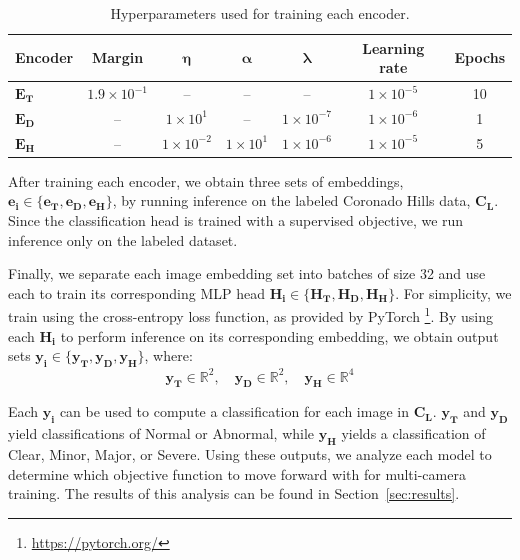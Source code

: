 \documentclass{article}
\begin{document}
\begin{table}[H]
\centering

\caption{Hyperparameters used for training each encoder.}
\label{tab:hyperparams}

\begin{tabular}{lcccccc}
\toprule
\textbf{Encoder} & \textbf{Margin} & $\boldsymbol{\eta}$ & $\boldsymbol{\alpha}$ & $\boldsymbol{\lambda}$ & \textbf{Learning rate} & \textbf{Epochs} \\
\midrule

$\mathbf{E_T}$ & $1.9 \times 10^{-1}$ & -- & -- & -- & $1 \times 10^{-5}$ & 10 \\
$\mathbf{E_D}$ & -- & $1 \times 10^{1}$ & -- & $1 \times 10^{-7}$ & $1 \times 10^{-6}$ & 1 \\
$\mathbf{E_H}$ & -- & $1 \times 10^{-2}$ & $1 \times 10^{1}$ & $1 \times 10^{-6}$ & $1 \times 10^{-5}$ & 5 \\

\bottomrule
\end{tabular}

\end{table}


After training each encoder, we obtain three sets of embeddings, $\mathbf{e_i} \in  \{\mathbf{e_T}, \mathbf{e_D}, \mathbf{e_H}\}$, by running inference on the labeled Coronado Hills data, $\mathbf{C_L}$. Since the classification head is trained with a supervised objective, we run inference only on the labeled dataset. 

Finally, we separate each image embedding set into batches of size 32 and use each to train its corresponding \ac{MLP} head $\mathbf{H_i} \in \{\mathbf{H_T}, \mathbf{H_D}, \mathbf{H_H}\}$. For simplicity, we train using the cross-entropy loss function, as provided by PyTorch \footnote{\url{https://pytorch.org/}}. By using each $\mathbf{H_i}$ to perform inference on its corresponding embedding, we obtain output sets $\mathbf{y_i} \in \{\mathbf{y_T}, \mathbf{y_D}, \mathbf{y_H}\}$, where:
\[\mathbf{y_T} \in \mathbb{R}^2, \quad \mathbf{y_D} \in \mathbb{R}^2, \quad\mathbf{y_H} \in \mathbb{R}^4\]

Each $\mathbf{y_i}$ can be used to compute a classification for each image in $\mathbf{C_L}$. $\mathbf{y_T}$ and $\mathbf{y_D}$ yield classifications of Normal or Abnormal, while $\mathbf{y_H}$ yields a classification of Clear, Minor, Major, or Severe. Using these outputs, we analyze each model to determine which objective function to move forward with for multi-camera training. The results of this analysis can be found in Section~\ref{sec:results}.
\end{document}
